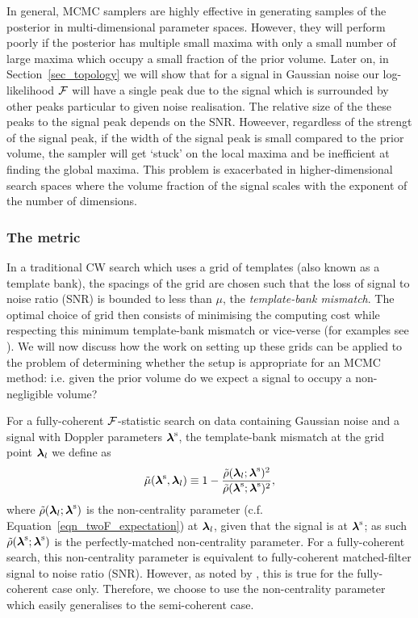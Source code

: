 \documentclass[aps, prd, twocolumn, superscriptaddress, floatfix, showpacs, nofootinbib, longbibliography]{revtex4-1}
\begin{document}
In general, MCMC samplers are highly effective in generating samples of the
posterior in multi-dimensional parameter spaces. However, they will perform
poorly if the posterior has multiple small maxima with only a small number of
large maxima which occupy a small fraction of the prior volume. Later on, in
Section~\ref{sec_topology} we will show that for a signal in Gaussian noise our
log-likelihood ${\mathcal{F}}$ will have a single peak due to the signal which is
surrounded by other peaks particular to given noise realisation. The relative
size of the these peaks to the signal peak depends on the SNR.  Howeever,
regardless of the strengt of the signal peak, if the width of the signal peak
is small compared to the prior volume, the sampler will get `stuck' on the
local maxima and be inefficient at finding the global maxima.  This problem is
exacerbated in higher-dimensional search spaces where the volume fraction of
the signal scales with the exponent of the number of dimensions.

\subsubsection{The metric}

In a traditional CW search which uses a grid of templates (also known as a
template bank), the spacings of the grid are chosen such that the loss of
signal to noise ratio (SNR) is bounded to less than $\mu$, the
\emph{template-bank mismatch}. The optimal choice of grid then consists of
minimising the computing cost while respecting this minimum template-bank
mismatch or vice-verse (for examples see \citet{pletsch2010, prix2012,
wette2013, wette2015}). We will now discuss how the work on setting up these
grids can be applied to the problem of determining whether the setup is
appropriate for an MCMC method: i.e. given the prior volume do we expect a
signal to occupy a non-negligible volume?

For a fully-coherent ${\mathcal{F}}$-statistic search on data containing Gaussian noise
and a signal with Doppler parameters $\boldsymbol{\mathbf{\lambda}}^{\rm s}$, the template-bank
mismatch at the grid point $\boldsymbol{\mathbf{\lambda}}_{l}$ we define as
\begin{align}
\tilde{\mu}(\boldsymbol{\mathbf{\lambda}}^{\rm s}, \boldsymbol{\mathbf{\lambda}}_{l}) \equiv 1 -
\frac{\tilde{\rho}(\boldsymbol{\mathbf{\lambda}}_l;\boldsymbol{\mathbf{\lambda}}^{\rm s})^{2}}
{\tilde{\rho}(\boldsymbol{\mathbf{\lambda}}^{\rm s}; \boldsymbol{\mathbf{\lambda}}^{\rm s})^{2}},
\end{align}
where $\tilde{\rho}(\boldsymbol{\mathbf{\lambda}}_l; \boldsymbol{\mathbf{\lambda}}^{\rm s})$ is the non-centrality
parameter (c.f. Equation~\ref{eqn_twoF_expectation}) at $\boldsymbol{\mathbf{\lambda}}_l$, given
that the signal is at $\boldsymbol{\mathbf{\lambda}}^{\rm s}$; as such $\tilde{\rho}(\boldsymbol{\mathbf{\lambda}}^{\rm s};
\boldsymbol{\mathbf{\lambda}}^{\rm s})$ is the perfectly-matched non-centrality parameter.  For a
fully-coherent search, this non-centrality parameter is equivalent to
fully-coherent matched-filter signal to noise ratio (SNR). However, as noted by
\citet{leaci2015}, this is true for the fully-coherent case only.  Therefore,
we choose to use the non-centrality parameter which easily generalises to the
semi-coherent case.
\end{document}
